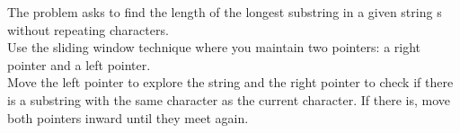 \documentclass[preview]{standalone}
\begin{document}
The problem asks to find the length of the longest substring in a given string s without repeating characters.\\Use the sliding window technique where you maintain two pointers: a right pointer and a left pointer.\\Move the left pointer to explore the string and the right pointer to check if there is a substring with the same character as the current character. If there is, move both pointers inward until they meet again.\\
\end{document}
